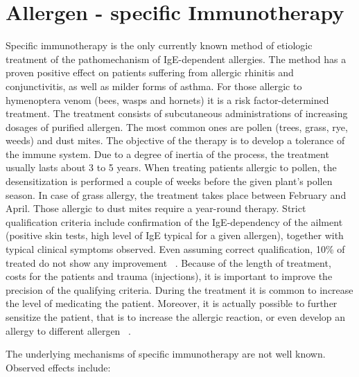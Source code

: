 \documentclass[10pt,oneside]{memoir}
\begin{document}
\chapter{Allergen - specific Immunotherapy}
\label{allergen-specificimmunotherapy}

Specific immunotherapy is the only currently known method of etiologic treatment of the pathomechanism of IgE-dependent allergies. The method has a proven positive effect on patients suffering from allergic rhinitis and conjunctivitis, as well as milder forms of asthma. For those allergic to hymenoptera venom (bees, wasps and hornets) it is a risk factor-determined treatment. The treatment consists of subcutaneous administrations of increasing dosages of purified allergen. The most common ones are pollen (trees, grass, rye, weeds) and dust mites. The objective of the therapy is to develop a tolerance of the immune system. Due to a degree of inertia of the process, the treatment usually lasts about 3 to 5 years. When treating patients allergic to pollen, the desensitization is performed a couple of weeks before the given plant's pollen season. In case of grass allergy, the treatment takes place between February and April. Those allergic to dust mites require a year-round therapy. Strict qualification criteria include confirmation of the IgE-dependency of the ailment (positive skin tests, high level of IgE typical for a given allergen), together with typical clinical symptoms observed. Even assuming correct qualification, 10\% of treated do not show any improvement ~\cite{Alergologia:1998}. Because of the length of treatment, costs for the patients and trauma (injections), it is important to improve the precision of the qualifying criteria.
During the treatment it is common to increase the level of medicating the patient. Moreover, it is actually possible to further sensitize the patient, that is to increase the allergic reaction, or even develop an allergy to different allergen ~\cite{Cichocka-Jarosz:1997}.


The underlying mechanisms of specific immunotherapy are not well known. Observed effects include:
\end{document}
